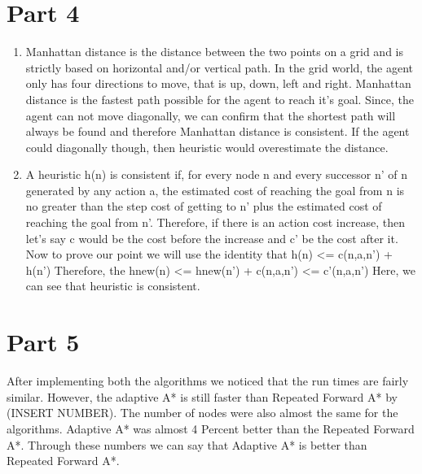\documentclass[a4paper, 12pt, one column]{article}
\begin{document}
  
\section*{Part 4}
  \begin{enumerate}[label=\alph*]
    \item 
      \begin{flushleft}
      Manhattan distance is the distance between the two points on a grid and is strictly based on horizontal and/or vertical path. In the grid world, the agent only has four directions to move, that is up, down, left and right. Manhattan distance is the fastest path possible for the agent to reach it's goal. Since, the agent can not move diagonally, we can confirm that the shortest path will always be found and therefore Manhattan distance is consistent. If the agent could diagonally though, then heuristic would overestimate the distance. 

      \end{flushleft}
    \item 
    \begin{flushleft}
    A heuristic h(n) is consistent if, for every node n and every successor n’ of n generated by any action a, the estimated cost of reaching the goal from n is no greater than the step cost of getting to n’ plus the estimated cost of reaching the goal from n’. Therefore, if there is an action cost increase, then let's say c would be the cost before the increase and c' be the cost after it. Now to prove our point we will use the identity that 
    h(n) <= c(n,a,n') + h(n')
    Therefore, the hnew(n) <= hnew(n') + c(n,a,n') <= c'(n,a,n')
    Here, we can see that heuristic is consistent. 
 
    \end{flushleft}
  \end{enumerate}
  
\newpage  
\section*{Part 5}
        After implementing both the algorithms we noticed that the run times are fairly similar. However, the adaptive A* is still faster than Repeated Forward A* by (INSERT NUMBER). The number of nodes were also almost the same for the algorithms. Adaptive A* was almost 4 Percent better than the Repeated Forward A*. Through these numbers we can say that Adaptive A* is better than Repeated Forward A*. 
        
\end{document}
